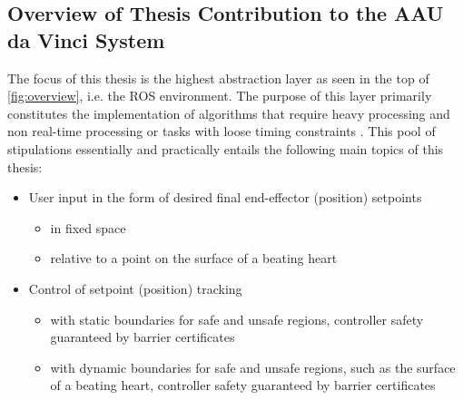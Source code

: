 \subsection{Overview of Thesis Contribution to the AAU da Vinci System}\label{sec:project_overview}
The focus of this thesis is the highest abstraction layer as seen in the top of \autoref{fig:overview}, i.e. the ROS environment. The purpose of this layer primarily constitutes the implementation of algorithms that require heavy processing and non real-time processing or tasks with loose timing constraints \citep{bib:robot_paper}.
This pool of stipulations essentially and practically entails the following main topics of this thesis:
\begin{itemize}
\itemsep-1.3mm
	\item User input in the form of desired final end-effector (position) setpoints
	\begin{itemize}
		\vspace*{-1mm}
		\item in fixed space
		\item relative to a point on the surface of a beating heart
	\end{itemize}
	\item Control of setpoint (position) tracking 
	\begin{itemize}
		\vspace*{-1mm}
		\item with static boundaries for safe and unsafe regions, controller safety guaranteed by barrier certificates
		\item with dynamic boundaries for safe and unsafe regions,  such as the surface of a beating heart, controller safety guaranteed by barrier certificates
	\end{itemize}
\end{itemize}






